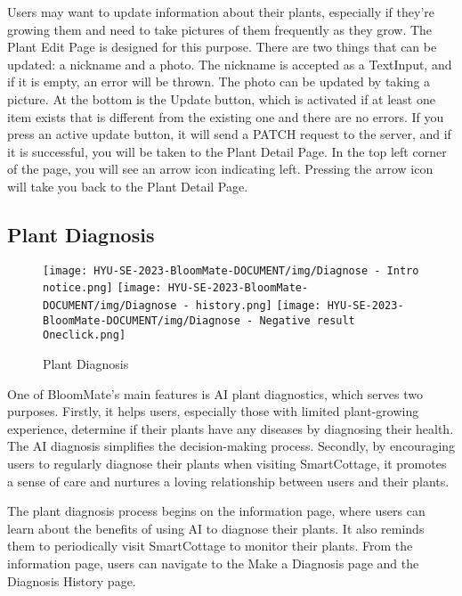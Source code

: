 \documentclass[conference, a4paper]{IEEEtran}
\begin{document}
    Users may want to update information about their plants, especially if they're growing them and need to take pictures of them frequently as they grow. The Plant Edit Page is designed for this purpose. There are two things that can be updated: a nickname and a photo. The nickname is accepted as a TextInput, and if it is empty, an error will be thrown. The photo can be updated by taking a picture. At the bottom is the Update button, which is activated if at least one item exists that is different from the existing one and there are no errors. If you press an active update button, it will send a PATCH request to the server, and if it is successful, you will be taken to the Plant Detail Page. In the top left corner of the page, you will see an arrow icon indicating left. Pressing the arrow icon will take you back to the Plant Detail Page.
    

    \subsection{Plant Diagnosis}
    \begin{figure}[h]
    \centerline{
        \texttt{[image: HYU-SE-2023-BloomMate-DOCUMENT/img/Diagnose - Intro notice.png]}
        \texttt{[image: HYU-SE-2023-BloomMate-DOCUMENT/img/Diagnose - history.png]}
        \texttt{[image: HYU-SE-2023-BloomMate-DOCUMENT/img/Diagnose - Negative result Oneclick.png]}
    }
    \label{fig}
    \caption{Plant Diagnosis}
    \end{figure}
One of BloomMate's main features is AI plant diagnostics, which serves two purposes. Firstly, it helps users, especially those with limited plant-growing experience, determine if their plants have any diseases by diagnosing their health. The AI diagnosis simplifies the decision-making process. Secondly, by encouraging users to regularly diagnose their plants when visiting SmartCottage, it promotes a sense of care and nurtures a loving relationship between users and their plants.

The plant diagnosis process begins on the information page, where users can learn about the benefits of using AI to diagnose their plants. It also reminds them to periodically visit SmartCottage to monitor their plants. From the information page, users can navigate to the Make a Diagnosis page and the Diagnosis History page.\\
\end{document}
